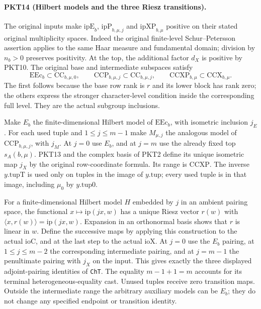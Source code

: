 \paragraph{PKT14 (Hilbert models and the three Riesz transitions).}\label{claim:PKT14}
The original inputs make $\mathrm{ipE}_b$, $\mathrm{ipP}_{b,\mu,j}$ and
$\mathrm{ipXP}_{b,\mu}$ positive on their stated original multiplicity
spaces.  Indeed the original finite-level Schur--Petersson assertion applies
to the same Haar measure and fundamental domain; division by $n_b>0$
preserves positivity.  At the top, the additional factor $d_X$ is positive
by PKT10.  The original base and intermediate subspaces satisfy
\[
 \mathrm{EEc}_b\subset\mathrm{CC}_{b,\mu,0},\qquad
 \mathrm{CCP}_{b,\mu,j}\subset\mathrm{CC}_{b,\mu,j},\qquad
 \mathrm{CCXP}_{b,\mu}\subset\mathrm{CCX}_{b,\mu}.
 \tag{PKT.15}
\]
The first follows because the base row rank is $r$ and its lower block has
rank zero; the others express the stronger character-level condition inside
the corresponding full level.  They are the actual subgroup inclusions.

Make $E_b$ the finite-dimensional Hilbert model of $\mathrm{EEc}_b$, with
isometric inclusion $j_E$.  For each used tuple and $1\le j\le m-1$ make
$M_{\mu,j}$ the analogous model of $\mathrm{CCP}_{b,\mu,j}$, with $j_M$.
At $j=0$ use $E_b$, and at $j=m$ use the already fixed top $s_A(b,\mu)$.
PKT13 and the complex basis of PKT2 define its unique isometric map $j_X$
by the original row-coordinate formula.  Its range is $\mathrm{CCXP}$.
The inverse $y.\mathrm{tupT}$ is used only on tuples in the image of
$y.\mathrm{tup}$; every used tuple is in that image, including $\mu_0$
by $y.\mathrm{tup0}$.

For a finite-dimensional Hilbert model $H$ embedded by $j$ in an ambient
pairing space, the functional $x\mapsto \mathrm{ip}(jx,w)$ has a unique
Riesz vector $r(w)$ with $\langle x,r(w)\rangle=\mathrm{ip}(jx,w)$.
Expansion in an orthonormal basis shows that $r$ is linear in $w$.
Define the successive maps by applying this construction to the actual
$\mathrm{ioC}$, and at the last step to the actual $\mathrm{ioX}$.
At $j=0$ use the $E_b$ pairing, at $1\le j\le m-2$ the corresponding
intermediate pairing, and at $j=m-1$ the penultimate pairing with $j_X$
on the input.  This gives exactly the three displayed adjoint-pairing
identities of \texttt{ChT}.  The equality $m-1+1=m$ accounts for its
terminal heterogeneous-equality cast.  Unused tuples receive zero transition
maps.  Outside the intermediate range the arbitrary auxiliary models can
be $E_b$; they do not change any specified endpoint or transition identity.


